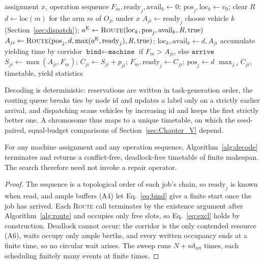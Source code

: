 \begin{algorithm}[t]
\caption{\textsc{Decode}: fitness from a complete conflict-free simulation}
\label{alg:decode}
\footnotesize
\begin{algorithmic}[1]
\Require assignment $x$, operation sequence
\State $F_m,\mathrm{ready}_j,\mathrm{avail}_k\gets 0$; $\mathrm{pos}_j,\mathrm{loc}_k\gets v_0$; clear $R$
  \State $d\gets \mathrm{loc}(m)$ for the arm $m$ of $O_{ji}$ under $x$
   \State $A_{ji}\gets \mathrm{ready}_j$
  \Else
     \State choose vehicle $k$ (Section~\ref{sec:dispatch}); $a^{\mathrm{E}}\gets\textsc{Route}(\mathrm{loc}_k,\mathrm{pos}_j,\mathrm{avail}_k,R,\text{true})$
     \State $A_{ji}\gets\textsc{Route}(\mathrm{pos}_j,d,\max(a^{\mathrm{E}},\mathrm{ready}_j),R,\text{true})$; $\mathrm{loc}_k,\mathrm{avail}_k\gets d,A_{ji}$
     \State accumulate yielding time by corridor
  \EndIf
  \State $\texttt{bind}\gets\texttt{machine}$ if $F_m>A_{ji}$, else $\texttt{arrive}$
  \State $S_{ji}\gets\max(A_{ji},F_m)$; $C_{ji}\gets S_{ji}+p_{ji}$; $F_m,\mathrm{ready}_j\gets C_{ji}$; $\mathrm{pos}_j\gets d$
\EndFor
\State \Return $\max_{j,i} C_{ji}$, timetable, yield statistics
\end{algorithmic}
\end{algorithm}

Decoding is deterministic: reservations are written in task-generation order, the routing queue breaks ties by node id and updates a label only on a strictly earlier arrival, and dispatching scans vehicles by increasing id and keeps the first strictly better one.
A chromosome thus maps to a unique timetable, on which the seed-paired, equal-budget comparisons of Section~\ref{sec:Chapter_V} depend.

\begin{prop}
  \label{prop:decodable}
  For any machine assignment and any operation sequence, Algorithm~\ref{alg:decode} terminates and returns a conflict-free, deadlock-free timetable of finite makespan. The search therefore need not invoke a repair operator.
\end{prop}

\begin{proof}
The sequence is a topological order of each job's chain, so $\mathrm{ready}_j$ is known when read, and ample buffers (A4) let Eq.~\eqref{eq:bind} give a finite start once the job has arrived.
Each \textsc{Route} call terminates by the existence argument after Algorithm~\ref{alg:route} and occupies only free slots, so Eq.~\eqref{eq:excl} holds by construction.
Deadlock cannot occur: the corridor is the only contended resource (A6), waits occupy only ample berths, and every written occupancy ends at a finite time, so no circular wait arises.
The sweep runs $N+n\delta_{\mathrm{ret}}$ times, each scheduling finitely many events at finite times.
\end{proof}

